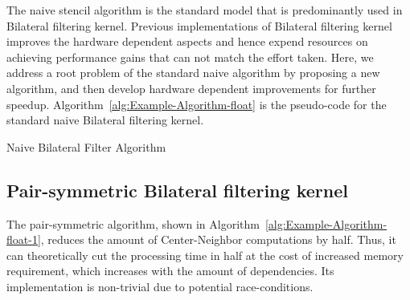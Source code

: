 \documentclass{IEEEtran}
\begin{document}
The naive stencil algorithm is the standard model that is predominantly used in Bilateral filtering kernel. Previous implementations\cite{Paris2009,Pham2005} of Bilateral filtering kernel improves the hardware dependent aspects and hence expend resources on achieving performance gains that can not match the effort taken. Here, we address a root problem of the standard naive algorithm by proposing a new algorithm, and then develop hardware dependent improvements for further speedup. Algorithm~\ref{alg:Example-Algorithm-float} is the pseudo-code for the standard naive Bilateral filtering kernel.


\begin{algorithm}[!h]
\caption{Naive Bilateral Filter Algorithm}
\label{alg:Example-Algorithm-float}
\begin{algorithmic}
\ENDFOR
\ENDFOR
{}
\ENDFOR
\end{algorithmic}
\end{algorithm}

\subsection{Pair-symmetric Bilateral filtering kernel}
The pair-symmetric algorithm, shown in Algorithm~\ref{alg:Example-Algorithm-float-1}, reduces the amount of Center-Neighbor computations by half. Thus, it can theoretically cut the processing time in half at the cost of increased memory requirement, which increases with the amount of dependencies. Its implementation is non-trivial due to potential race-conditions.
	
\end{document}
